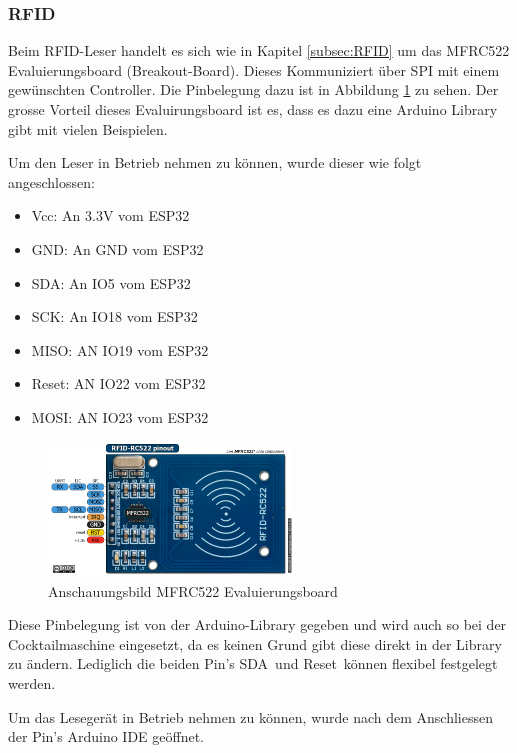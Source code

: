 \subsubsection{RFID}
\label{subsubsec:Inbetriebnahme_RFID}

Beim RFID-Leser handelt es sich wie in Kapitel \ref{subsec:RFID} um das MFRC522 Evaluierungsboard (Breakout-Board). Dieses Kommuniziert über SPI mit einem gewünschten Controller. Die Pinbelegung dazu ist in Abbildung \ref{fig:MFRC522} zu sehen. Der grosse Vorteil dieses Evaluirungsboard ist es, dass es dazu eine Arduino Library gibt mit vielen Beispielen.

Um den Leser in Betrieb nehmen zu können, wurde dieser wie folgt angeschlossen:


\begin{itemize}
\item Vcc: An 3.3V vom ESP32
\item GND: An GND vom ESP32
\item SDA: An IO5 vom ESP32
\item SCK: An IO18 vom ESP32
\item MISO: AN IO19 vom ESP32
\item Reset: AN IO22 vom ESP32
\item MOSI: AN IO23 vom ESP32
\end{itemize}

\begin{figure}[h!]
\center
\includegraphics[width = 0.58\textwidth]{graphics/MFRC522}
\caption{Anschauungsbild MFRC522 Evaluierungsboard}
\label{fig:MFRC522}
\end{figure}

Diese Pinbelegung ist von der Arduino-Library gegeben und wird auch so bei der Cocktailmaschine eingesetzt, da es keinen Grund gibt diese direkt in der Library zu ändern. Lediglich die beiden Pin's \flqq SDA\frqq~und \flqq Reset\frqq~können flexibel festgelegt werden.

Um das Lesegerät in Betrieb nehmen zu können, wurde nach dem Anschliessen der Pin's Arduino IDE geöffnet. 






